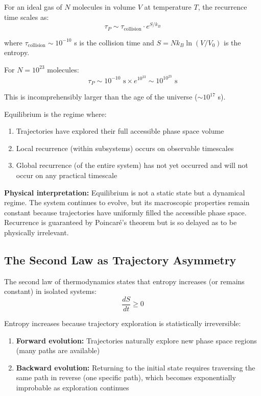 For an ideal gas of $N$ molecules in volume $V$ at temperature $T$, the recurrence time scales as:
\begin{equation}
\tau_P \sim \tau_{\text{collision}} \cdot e^{S/k_B}
\end{equation}

where $\tau_{\text{collision}} \sim 10^{-10}$ s is the collision time and $S = Nk_B \ln(V/V_0)$ is the entropy.

For $N = 10^{23}$ molecules:
\begin{equation}
\tau_P \sim 10^{-10} \text{ s} \times e^{10^{23}} \sim 10^{10^{23}} \text{ s}
\end{equation}

This is incomprehensibly larger than the age of the universe ($\sim 10^{17}$ s).

\begin{proposition}
\label{prop:equilibrium_saturation}
Equilibrium is the regime where:
\begin{enumerate}
\item Trajectories have explored their full accessible phase space volume
\item Local recurrence (within subsystems) occurs on observable timescales
\item Global recurrence (of the entire system) has not yet occurred and will not occur on any practical timescale
\end{enumerate}
\end{proposition}

\textbf{Physical interpretation:} Equilibrium is not a static state but a dynamical regime. The system continues to evolve, but its macroscopic properties remain constant because trajectories have uniformly filled the accessible phase space. Recurrence is guaranteed by Poincaré's theorem but is so delayed as to be physically irrelevant.

\subsection{The Second Law as Trajectory Asymmetry}

The second law of thermodynamics states that entropy increases (or remains constant) in isolated systems:
\begin{equation}
\frac{dS}{dt} \geq 0
\end{equation}

\begin{theorem}
\label{thm:second_law_trajectory}
Entropy increases because trajectory exploration is statistically irreversible:
\begin{enumerate}
\item \textbf{Forward evolution:} Trajectories naturally explore new phase space regions (many paths are available)
\item \textbf{Backward evolution:} Returning to the initial state requires traversing the same path in reverse (one specific path), which becomes exponentially improbable as exploration continues
\end{enumerate}
\end{theorem}


